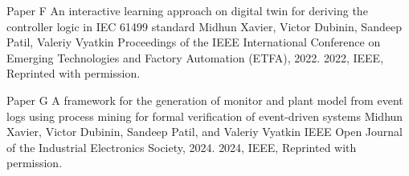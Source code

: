\documentclass[12pt,a4paper,openright,final,twoside]{cseethesis}
\begin{document}
\def\paperheader{Paper F}
\def\papertitle{An interactive learning approach on digital twin for deriving the controller logic in IEC 61499 standard}
\def\paperauthorstring{Midhun Xavier, Victor Dubinin, Sandeep Patil, Valeriy Vyatkin}
\def\referencestring{Proceedings of the IEEE International Conference on Emerging Technologies and Factory Automation (ETFA), 2022.}
\def\copyrightstring{2022, IEEE, Reprinted with permission.}


\makepaperaccepted
  {\paperheader}
  {\papertitle}
  {\paperauthorstring}
  {\referencestring}
  {\copyrightstring}



\def\paperheader{Paper G}
\def\papertitle{A framework for the generation of monitor and plant model from event logs using process mining for formal verification of event-driven systems}
\def\paperauthorstring{Midhun Xavier, Victor Dubinin, Sandeep Patil, and Valeriy Vyatkin}
\def\referencestring{IEEE Open Journal of the Industrial Electronics Society, 2024.}
\def\copyrightstring{2024, IEEE, Reprinted with permission.}


\makepaperaccepted
  {\paperheader}
  {\papertitle}
  {\paperauthorstring}
  {\referencestring}
  {\copyrightstring}



\def\paperheader{Paper H}
\def\papertitle{Developing a Test Suite for Evaluating IEC 61499 Application Portability}
\def\paperauthorstring{Midhun Xavier, Tatiana Laikh, Sandeep Patil, Valeriy Vyatkin}
\def\referencestring{Proceedings of the IEEE International Conference on Industrial Informatics (INDIN), 2021.}
\def\copyrightstring{2021, IEEE, Reprinted with permission.}
\end{document}
